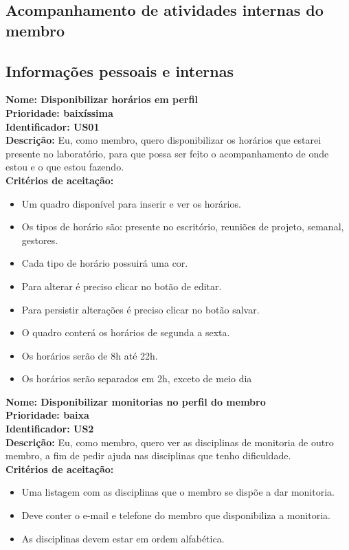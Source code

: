 \begin{anexosenv}
\section{Acompanhamento de atividades internas do membro}

\subsection{Informações pessoais e internas}

\indent \textbf{Nome: Disponibilizar horários em perfil\\
\indent Prioridade: baixíssima\\
\indent Identificador: US01\\
\indent Descrição: }Eu, como membro, quero disponibilizar os horários que estarei presente no laboratório, para que possa ser feito o acompanhamento de onde estou e o que estou fazendo.\\
\indent \textbf{Critérios de aceitação:}
\begin{itemize}
    \item Um quadro disponível para inserir e ver os horários.
    \item Os tipos de horário são: presente no escritório, reuniões de projeto, semanal, gestores.
    \item Cada tipo de horário possuirá uma cor.
    \item Para alterar é preciso clicar no botão de editar.
    \item Para persistir alterações é preciso clicar no botão salvar.
    \item O quadro conterá os horários de segunda a sexta.
    \item Os horários serão de 8h até 22h.
    \item Os horários serão separados em 2h, exceto de meio dia
\end{itemize}

\indent \textbf{Nome: Disponibilizar monitorias no perfil do membro\\
\indent Prioridade: baixa\\
\indent Identificador: US2\\
\indent Descrição:} Eu, como membro, quero ver as disciplinas de monitoria de outro membro, a fim de pedir ajuda nas disciplinas que tenho dificuldade.\\
\indent \textbf{Critérios de aceitação:}
\begin{itemize}
    \item Uma listagem com as disciplinas que o membro se dispõe a dar monitoria.
    \item Deve conter o e-mail e telefone do membro que disponibiliza a monitoria.
    \item As disciplinas devem estar em ordem alfabética.
\end{itemize}


\end{anexosenv}
